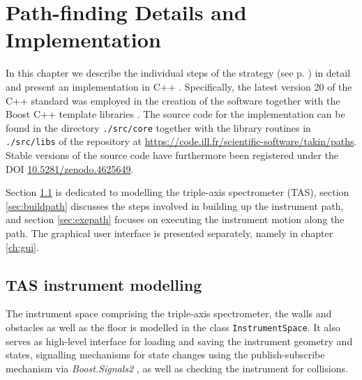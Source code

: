 %
%

\chapter{Path-finding Details and Implementation}
\label{ch:impl}

In this chapter we describe the individual steps of the strategy (see p. \pageref{sec:strategy}) in detail
and present an implementation in C++ \cite{Stroustrup2008, Stroustrup2018}. Specifically,
the latest version 20 of the C++ standard \cite{ISOCPP20} was employed in the creation of the software
together with the Boost C++ template libraries \cite{web_boost}. The source code for the implementation
can be found in the directory \lstinline|./src/core| together with the library routines in \lstinline|./src/libs|
of the repository at \url{https://code.ill.fr/scientific-software/takin/paths}. Stable versions of the
source code have furthermore been registered under the DOI \href{https://doi.org/10.5281/zenodo.4625649}{10.5281/zenodo.4625649}.

Section \ref{sec:tasmodel} is dedicated to modelling the triple-axis spectrometer (TAS), 
section \ref{sec:buildpath} discusses the steps involved in building up the instrument path, 
and section \ref{sec:exepath} focuses on executing the instrument motion along the path.
The graphical user interface is presented separately, namely in chapter \ref{ch:gui}.





\section{TAS instrument modelling}
\label{sec:tasmodel}

The instrument space comprising the triple-axis spectrometer, the walls and obstacles as well as the floor is modelled in
the class \lstinline[language=C++]|InstrumentSpace|. It also serves as high-level interface for loading and saving
the instrument geometry and states, signalling mechanisms for state changes using the publish-subscribe mechanism
via \textit{Boost.Signals2} \cite{web_boost_signals}, as well as checking the instrument for collisions.


